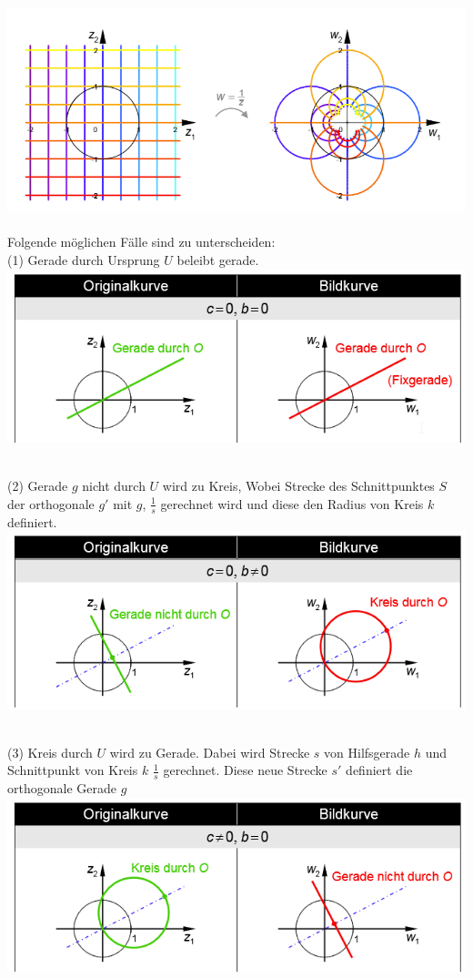 \includegraphics[width=\columnwidth]{Images/kehrwert_funktion}\\
~\\
Folgende möglichen Fälle sind zu unterscheiden:\\
\noindent (1) Gerade durch Ursprung $U$ beleibt gerade.\\
\includegraphics[width=\columnwidth]{Images/kreisspiegelung_gerade_o}

~\\
\noindent (2) Gerade $g$ nicht durch $U$ wird zu Kreis, Wobei Strecke des Schnittpunktes $S$ der orthogonale $g'$ mit $g$, $\frac{1}{s}$ gerechnet wird und diese den Radius von Kreis $k$ definiert.\\
\includegraphics[width=\columnwidth]{Images/kreisspiegelung_gerade_no}

~\\
\noindent (3) Kreis durch $U$ wird zu Gerade. Dabei wird Strecke $s$ von Hilfsgerade $h$ und Schnittpunkt von Kreis $k$ $\frac{1}{s}$ gerechnet. Diese neue Strecke $s'$ definiert die orthogonale Gerade $g$\\
\includegraphics[width=\columnwidth]{Images/kreisspiegelung_kreis_o}

